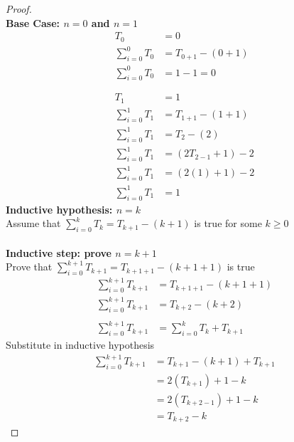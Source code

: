 \documentclass[11pt]{article}
\theoremstyle{definition}
\theoremstyle{definition}
\theoremstyle{definition}
\begin{document}

\begin{proof} $ $ \\
\textbf{Base Case: $n = 0$ and $n= 1$}
\begin{align*}
    T_0  &= 0 \\ 
    \sum_{i=0}^{0} T_{0} &= T_{0+1} - (0+1) \\
    \sum_{i=0}^{0} T_{0} &= 1-1 = 0 \\ \\ \\
    T_1 &= 1 \\
    \sum_{i=0}^{1} T_{1} &= T_{1+1} - (1+1) \\
    \sum_{i=0}^{1} T_{1} &= T_2 - (2) \\
    \sum_{i=0}^{1} T_{1} &= (2T_{2-1} + 1) - 2 \\
    \sum_{i=0}^{1} T_{1} &= (2(1) + 1) - 2 \\
    \sum_{i=0}^{1} T_{1} &= 1 
\end{align*}
\textbf{Inductive hypothesis: $n=k$}\\ 
Assume that $\sum_{i=0}^{k} T_{k} = T_{k+1} - (k+1)$ is true for some $k \geq 0$ \\ \\
\textbf{Inductive step: prove $n=k+1$}\\ 
Prove that $\sum_{i=0}^{k+1} T_{k+1} = T_{k+1+1} - (k+1+1)$ is true
\begin{align*}
    \sum_{i=0}^{k+1} T_{k+1} &= T_{k+1+1} - (k+1+1) \\
    \sum_{i=0}^{k+1} T_{k+1} &= T_{k+2} - (k+2) \\ \\
    \sum_{i=0}^{k+1} T_{k+1} &= \sum_{i=0}^{k} T_{k} + T_{k+1}
\end{align*}
Substitute in inductive hypothesis
\begin{align*}
    \sum_{i=0}^{k+1} T_{k+1} &=  T_{k+1} - (k+1) + T_{k+1} \\
    &= 2(T_{k+1}) + 1 - k \\
    &= 2(T_{k+2-1}) + 1 - k \\
    &= T_{k+2} - k
\end{align*}
\end{proof}





\end{document}

